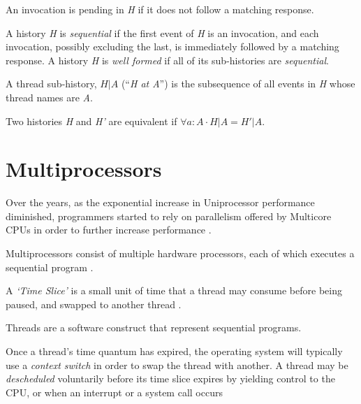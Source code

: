\begin{definition}
An invocation is pending in \emph{H} if it does not follow a matching response.    
\end{definition}

\begin{definition}[History]
A history \emph{H} is \emph{sequential} if the first event of \emph{H} is an invocation, and each invocation, possibly excluding the last, is immediately followed by a matching response. A history \emph{H} is \emph{well formed} if all of its sub-histories are \emph{sequential}.
\end{definition}

\begin{definition}
A thread sub-history, $H|A$  (``\emph{H at A}'') is the subsequence of all events in \emph{H} whose thread names are \emph{A}.
\end{definition}

\begin{definition}[Equivalence]
Two histories \emph{H} and \emph{H'} are equivalent if $\forall a:A \cdot H|A = H'|A$.
\end{definition}

\section{Multiprocessors}
Over the years, as the exponential increase in Uniprocessor performance diminished, programmers started to rely on parallelism offered by Multicore CPUs in order to further increase performance \cite{cantrill2008real}.

\begin{definition}[Multiprocessor]
    Multiprocessors consist of multiple hardware processors, each of which executes a sequential program \cite[Appendix~B.2]{herlihy2020art}.
\end{definition}
\begin{definition}
    A \emph{`Time Slice'} is a small unit of time that a thread may consume before being paused, and swapped to another thread \cite{osconcepts2021}.
\end{definition}
\begin{definition}[Threads]
    Threads are a software construct that represent sequential programs.
\end{definition}
\begin{definition}
Once a thread's time quantum has expired, the operating system will typically use a \emph{context switch} in order to swap the thread with another. A thread may be \emph{descheduled} voluntarily before its time slice expires by yielding control to the CPU, or when an interrupt or a system call occurs \cite[Section~3.2.3]{osconcepts2021}
\end{definition}

